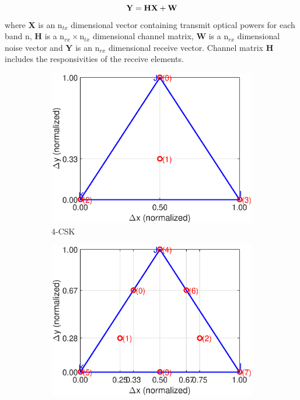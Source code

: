 \documentclass[10pt,letterpaper]{article}
\newcommand{\vm}[1]{{\bf{#1}}}
\begin{document}
\begin{equation}
	\vm{Y} = \vm{H}\vm{X} + \vm{W}
	\label{eqCHNL}
\end{equation}
where \vm{X} is an n$_{tx}$ dimensional vector containing transmit optical powers for each band n, \vm{H} is a n$_{rx}\times$n$_{tx}$ dimensional channel matrix, \vm{W} is a n$_{rx}$ dimensional noise vector and \vm{Y} is an n$_{rx}$ dimensional receive vector. Channel matrix \vm{H} includes the responsivities of the receive elements.

\begin{figure}[t]
	\centering
		\begin{subfigure}{0.32\textwidth}
		\centering
			\includegraphics[trim={0.05in 0.0in 0.25in 0.2in}, clip=true, width=\textwidth]{CBCrules4.eps}
			\caption{4-CSK}
			\label{fig4Const}
		\end{subfigure}
		\hfill
		\begin{subfigure}{0.32\textwidth}
		\centering
			\includegraphics[trim={0.05in 0.0in 0.25in 0.2in}, clip=true, width=\textwidth]{CBCrules8.eps}

\end{subfigure}
\end{figure}
\end{document}
